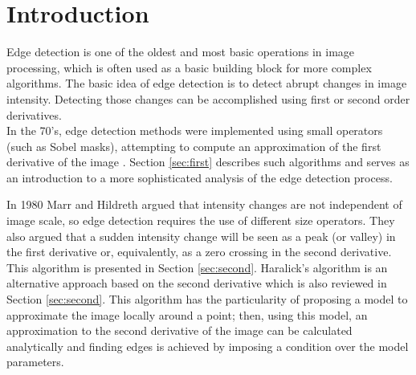 \documentclass{ipol}
\numberwithin{equation}{section}
\numberwithin{table}{section}
\begin{document}




\section{Introduction}
\label{sec:intro}

Edge detection is one of the oldest and most basic operations in image processing, which is often used as a basic building block for more complex algorithms. The basic idea of edge detection is to detect abrupt changes in image intensity. 
Detecting those changes can be accomplished using first or second order derivatives. \\

In the 70's, edge detection methods were implemented using small operators 
(such as Sobel masks), attempting to compute an approximation of the
first derivative of the image \cite{Gonzalez2007Digital}. Section \ref{sec:first} describes such algorithms 
and serves as an introduction to a more sophisticated 
analysis of the edge detection process.

In 1980 Marr and Hildreth \cite{segm:edge_region:marr:84:digital_step} argued that intensity changes are not independent 
of image scale, so edge detection requires the use of different size 
operators. They also argued that a sudden intensity change will be seen 
as a peak (or valley) in the first derivative or, equivalently, as a zero 
crossing in the second derivative. This algorithm is presented in Section \ref{sec:second}. 
Haralick's algorithm \cite{bb20239} is an alternative approach based on the second derivative 
which is also reviewed in Section \ref{sec:second}. This algorithm has the particularity of 
proposing a model to approximate the image locally around a point; then, using this model, 
an approximation to the second derivative of the image can be calculated analytically and 
finding edges is achieved by imposing a condition over the model parameters. 
\end{document}
